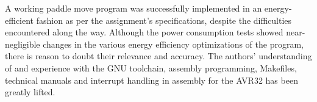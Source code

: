 A working paddle move program was successfully implemented in an energy-efficient fashion as per the assignment's specifications, despite the difficulties encountered along the way.
Although the power consumption tests showed near-negligible changes in the various energy efficiency optimizations of the program, there is reason to doubt their relevance and accuracy.
The authors' understanding of and experience with the GNU toolchain, assembly programming, Makefiles, technical manuals and interrupt handling in assembly for the AVR32 has been greatly lifted.
